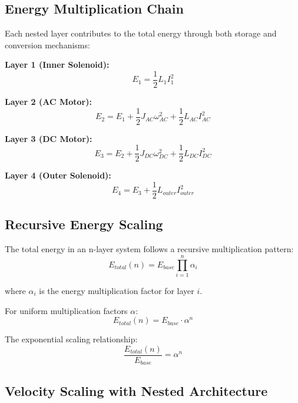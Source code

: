 \documentclass[12pt,a4paper]{article}
\begin{document}
\subsection{Energy Multiplication Chain}

Each nested layer contributes to the total energy through both storage and conversion mechanisms:

\textbf{Layer 1 (Inner Solenoid):}
\begin{equation}
E_1 = \frac{1}{2}L_1 I_1^2
\end{equation}

\textbf{Layer 2 (AC Motor):}
\begin{equation}
E_2 = E_1 + \frac{1}{2}J_{AC}\omega_{AC}^2 + \frac{1}{2}L_{AC}I_{AC}^2
\end{equation}

\textbf{Layer 3 (DC Motor):}
\begin{equation}
E_3 = E_2 + \frac{1}{2}J_{DC}\omega_{DC}^2 + \frac{1}{2}L_{DC}I_{DC}^2
\end{equation}

\textbf{Layer 4 (Outer Solenoid):}
\begin{equation}
E_4 = E_3 + \frac{1}{2}L_{outer}I_{outer}^2
\end{equation}

\subsection{Recursive Energy Scaling}

The total energy in an n-layer system follows a recursive multiplication pattern:
\begin{equation}
E_{total}(n) = E_{base} \prod_{i=1}^{n} \alpha_i
\end{equation}

where $\alpha_i$ is the energy multiplication factor for layer $i$.

For uniform multiplication factors $\alpha$:
\begin{equation}
E_{total}(n) = E_{base} \cdot \alpha^n
\end{equation}

The exponential scaling relationship:
\begin{equation}
\frac{E_{total}(n)}{E_{base}} = \alpha^n
\end{equation}

\subsection{Velocity Scaling with Nested Architecture}
\end{document}
